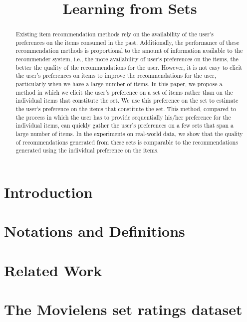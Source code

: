 \documentclass[conference]{IEEEtran}
\begin{document}
\title{\Large Learning from Sets}
\date{}
\maketitle

\begin{abstract}
Existing item recommendation methods rely on the availability of the user’s
preferences on the items consumed in the past. Additionally, the performance
of these recommendation methods is proportional to the amount of information
available to the recommender system, i.e., the more availability of user’s
preferences on the items, the better the quality of the recommendations for
the user. However, it is not easy to elicit the user’s preferences on items to
improve the recommendations for the user, particularly when we have a large
number of items. In this paper, we propose a method in which we elicit the
user’s preference on a set of items rather than on the individual items that
constitute the set. We use this preference on the set to estimate the user’s
preference on the items that constitute the set. This method, compared to the
process in which the user has to provide sequentially his/her preference for
the individual items, can quickly gather the user’s preferences on a few sets
that span a large number of items. In the experiments on real-world data, we
show that the quality of recommendations generated from these sets is
comparable to the recommendations generated using the individual preference on
the items.
\end{abstract}

\section{Introduction}
%

\section{Notations and Definitions}
%

\section{Related Work}
%

\section{The Movielens set ratings dataset}

\end{document}
